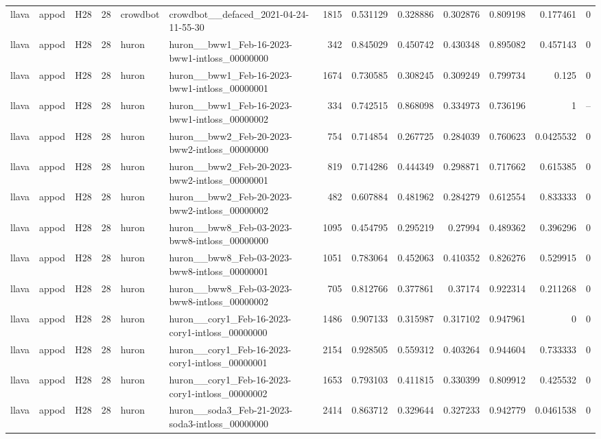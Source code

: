 \begin{longtable}{lllrllrrrrrrr}
llava & appod & H28 & 28 & crowdbot & crowdbot\_\_defaced\_2021-04-24-11-55-30 & 1815 & 0.531129 & 0.328886 & 0.302876 & 0.809198 & 0.177461 & 0 \\
llava & appod & H28 & 28 & huron & huron\_\_bww1\_Feb-16-2023-bww1-intloss\_00000000 & 342 & 0.845029 & 0.450742 & 0.430348 & 0.895082 & 0.457143 & 0 \\
llava & appod & H28 & 28 & huron & huron\_\_bww1\_Feb-16-2023-bww1-intloss\_00000001 & 1674 & 0.730585 & 0.308245 & 0.309249 & 0.799734 & 0.125 & 0 \\
llava & appod & H28 & 28 & huron & huron\_\_bww1\_Feb-16-2023-bww1-intloss\_00000002 & 334 & 0.742515 & 0.868098 & 0.334973 & 0.736196 & 1 & -- \\
llava & appod & H28 & 28 & huron & huron\_\_bww2\_Feb-20-2023-bww2-intloss\_00000000 & 754 & 0.714854 & 0.267725 & 0.284039 & 0.760623 & 0.0425532 & 0 \\
llava & appod & H28 & 28 & huron & huron\_\_bww2\_Feb-20-2023-bww2-intloss\_00000001 & 819 & 0.714286 & 0.444349 & 0.298871 & 0.717662 & 0.615385 & 0 \\
llava & appod & H28 & 28 & huron & huron\_\_bww2\_Feb-20-2023-bww2-intloss\_00000002 & 482 & 0.607884 & 0.481962 & 0.284279 & 0.612554 & 0.833333 & 0 \\
llava & appod & H28 & 28 & huron & huron\_\_bww8\_Feb-03-2023-bww8-intloss\_00000000 & 1095 & 0.454795 & 0.295219 & 0.27994 & 0.489362 & 0.396296 & 0 \\
llava & appod & H28 & 28 & huron & huron\_\_bww8\_Feb-03-2023-bww8-intloss\_00000001 & 1051 & 0.783064 & 0.452063 & 0.410352 & 0.826276 & 0.529915 & 0 \\
llava & appod & H28 & 28 & huron & huron\_\_bww8\_Feb-03-2023-bww8-intloss\_00000002 & 705 & 0.812766 & 0.377861 & 0.37174 & 0.922314 & 0.211268 & 0 \\
llava & appod & H28 & 28 & huron & huron\_\_cory1\_Feb-16-2023-cory1-intloss\_00000000 & 1486 & 0.907133 & 0.315987 & 0.317102 & 0.947961 & 0 & 0 \\
llava & appod & H28 & 28 & huron & huron\_\_cory1\_Feb-16-2023-cory1-intloss\_00000001 & 2154 & 0.928505 & 0.559312 & 0.403264 & 0.944604 & 0.733333 & 0 \\
llava & appod & H28 & 28 & huron & huron\_\_cory1\_Feb-16-2023-cory1-intloss\_00000002 & 1653 & 0.793103 & 0.411815 & 0.330399 & 0.809912 & 0.425532 & 0 \\
llava & appod & H28 & 28 & huron & huron\_\_soda3\_Feb-21-2023-soda3-intloss\_00000000 & 2414 & 0.863712 & 0.329644 & 0.327233 & 0.942779 & 0.0461538 & 0 \\

\end{longtable}

